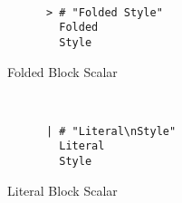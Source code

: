 \documentclass[a4paper, svgnames, 12pt]{article}
\begin{document}
\begin{figure}[H]
  \begin{minipage}[t]{0.48\textwidth}
    \vspace{0pt}
    \begin{bchart}[max=9, width=0.85\textwidth]
    \end{bchart}
  \end{minipage}
  \begin{minipage}[t]{0pt}~\end{minipage}
  \begin{minipage}[t]{0.48\textwidth}
    \vspace{0pt}
    \begin{verbatim}
      > # "Folded Style"
        Folded
        Style
    \end{verbatim}
  \end{minipage}
  \caption{Folded Block Scalar}
\end{figure}

\begin{figure}[H]
  \begin{minipage}[t]{0.48\textwidth}
    \vspace{0pt}
    \begin{bchart}[max=9, width=0.85\textwidth]
    \end{bchart}
  \end{minipage}
  \begin{minipage}[t]{0pt}~\end{minipage}
  \begin{minipage}[t]{0.48\textwidth}
    \vspace{0pt}
    \begin{verbatim}
      | # "Literal\nStyle"
        Literal
        Style
    \end{verbatim}
  \end{minipage}
  \caption{Literal Block Scalar}
\end{figure}
\end{document}
